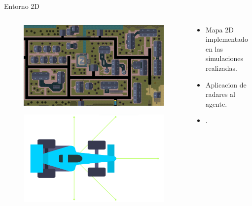 \documentclass{beamer}
\begin{document}
\begin{frame}{Entorno 2D}
    \begin{columns}
        \begin{column}{0.5\textwidth}
            \begin{figure}
                \centering
                \includegraphics[width=\linewidth]{images/gta2.png}
            \end{figure}
            \vspace{0.5cm} %
            \begin{figure}
                \centering
                \includegraphics[width=\linewidth]{images/sensores.png}
            \end{figure}
        \end{column}
        \begin{column}{0.5\textwidth}
            \begin{itemize}
                \item Mapa 2D implementado en las simulaciones realizadas.
                \item Aplicacion de radares al agente.
                \item .
            \end{itemize}
        \end{column}
    \end{columns}
\end{frame}
\end{document}
